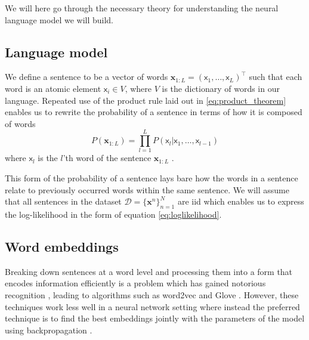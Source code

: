 We will here go through the necessary theory for understanding the neural language model we
will build.

\subsection{Language model}
We define a sentence to be a vector of words $\bm{x}_{1:L} = (\mathsf{x}_1, \dots,
\mathsf{x}_L)^{\top}$ such that each word is an atomic element $\mathsf{x}_i \in
V$, where $V$ is the dictionary of words in our language. Repeated use of the
product rule laid out in \eqref{eq:product_theorem} enables us to rewrite the probability
of a sentence in terms of how it is composed of words
\begin{equation}
  \label{eq:conditional_language_probability}
  P(\bm{x}_{1:L}) = \prod_{l = 1}^LP(\mathsf{x}_l | \mathsf{x}_1, \dots, \mathsf{x}_{l-1})
\end{equation}
where $\mathsf{x}_l$ is the $l$'th word of the sentence
$\bm{x}_{1:L}$ \cite{Bengio:2003:NPL:944919.944966}.

This form of the probability of a sentence lays bare how the words in a sentence
relate to previously occurred words within the same sentence. We will assume
that all sentences in the dataset $\mathcal{D} = \{\bm{x}^n\}_{n=1}^N$ are iid
which enables us to express the log-likelihood in the form of equation
\eqref{eq:loglikelihood}.

\subsection{Word embeddings}
Breaking down sentences at a word level and processing them into a form that
encodes information efficiently is a problem which has gained notorious
recognition \cite{DBLP:journals/corr/abs-1301-3781}, leading to algorithms such
as word2vec \cite{Mikolov:2013:DRW:2999792.2999959} and
Glove \cite{Pennington14glove:global}. However, these techniques work less well
in a neural network setting where instead the preferred technique is to find the
best embeddings jointly with the parameters of the model using backpropagation \cite[p.~5-7]{goldberg2015primer}.

